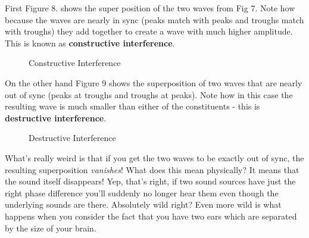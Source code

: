 \documentclass[10pt,a4paper]{article}
\begin{document}
First Figure 8. shows the super position of the two waves from Fig 7. Note how because the waves are nearly in sync (peaks match with peaks and troughs match with troughs) they add together to create a wave with much higher amplitude. This is known as \textbf{constructive interference}.

\begin{figure}[!htb]
\caption{\label{fig:my-label} Constructive Interference}
\end{figure}

On the other hand Figure 9 shows the superposition of two waves that are nearly out of sync (peaks at troughs and troughs at peaks). Note how in this case the resulting wave is much smaller than either of the constituents - this is \textbf{destructive interference}.

\begin{figure}[!htb]
\caption{\label{fig:my-label} Destructive Interference}
\end{figure}


What's really weird is that if you get the two waves to be exactly out of sync, the resulting superposition \textit{vanishes}! What does this mean physically? It means that the sound itself disappears! Yep, that's right, if two sound sources have just the right phase difference you'll suddenly no longer hear them even though the underlying sounds are there. Absolutely wild right? Even more wild is what happens when you consider the fact that you have two ears which are separated by the size of your brain. 
\end{document}
